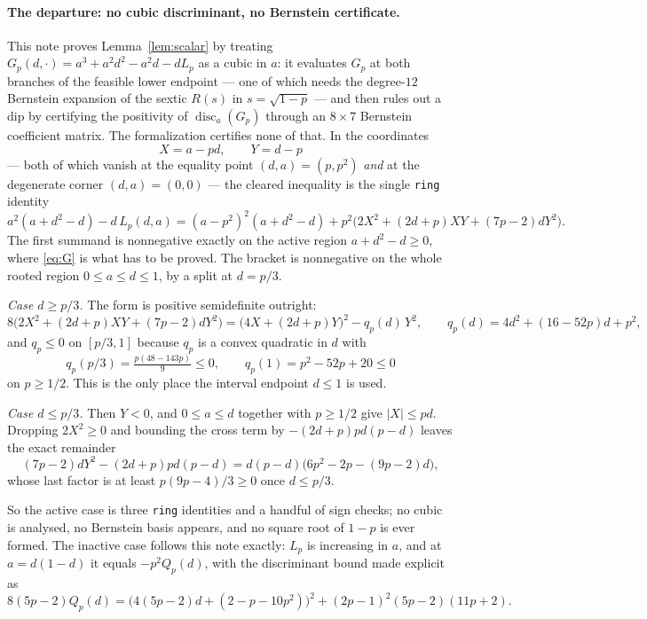 \documentclass[11pt]{article}
\begin{document}
\paragraph{The departure: no cubic discriminant, no Bernstein certificate.}
This note proves Lemma~\ref{lem:scalar} by treating
$G_p(d,\cdot)=a^3+a^2d^2-a^2d-dL_p$ as a cubic in $a$: it evaluates $G_p$ at
both branches of the feasible lower endpoint --- one of which needs the
degree-$12$ Bernstein expansion of the sextic $R(s)$ in $s=\sqrt{1-p}$ --- and
then rules out a dip by certifying the positivity of
$\operatorname{disc}_a(G_p)$ through an $8\times7$ Bernstein coefficient
matrix.  The formalization certifies none of that.  In the coordinates
\[
 X=a-pd,\qquad Y=d-p
\]
--- both of which vanish at the equality point $(d,a)=(p,p^2)$ \emph{and} at the
degenerate corner $(d,a)=(0,0)$ --- the cleared inequality is the single
\texttt{ring} identity
\begin{equation}
 a^2(a+d^2-d)-d\,L_p(d,a)
 =(a-p^2)^2(a+d^2-d)
 +p^2\bigl(2X^2+(2d+p)XY+(7p-2)dY^2\bigr).
 \label{eq:lean-adj}
\end{equation}
The first summand is nonnegative exactly on the active region $a+d^2-d\geq0$,
where \eqref{eq:G} is what has to be proved.  The bracket is nonnegative on the
whole rooted region $0\leq a\leq d\leq1$, by a split at $d=p/3$.

\emph{Case $d\geq p/3$.}  The form is positive semidefinite outright:
\begin{equation}
 8\bigl(2X^2+(2d+p)XY+(7p-2)dY^2\bigr)
 =\bigl(4X+(2d+p)Y\bigr)^2-q_p(d)\,Y^2,
 \qquad
 q_p(d)=4d^2+(16-52p)d+p^2,
 \label{eq:lean-adj-pd}
\end{equation}
and $q_p\leq0$ on $[p/3,1]$ because $q_p$ is a convex quadratic in $d$ with
\[
 q_p(p/3)=\tfrac{p(48-143p)}9\leq0,
 \qquad
 q_p(1)=p^2-52p+20\leq0
\]
on $p\geq1/2$.  This is the only place the interval endpoint $d\leq1$ is used.

\emph{Case $d\leq p/3$.}  Then $Y<0$, and $0\leq a\leq d$ together with
$p\geq1/2$ give $|X|\leq pd$.  Dropping $2X^2\geq0$ and bounding the cross term
by $-(2d+p)pd(p-d)$ leaves the exact remainder
\[
 (7p-2)dY^2-(2d+p)pd(p-d)=d(p-d)\bigl(6p^2-2p-(9p-2)d\bigr),
\]
whose last factor is at least $p(9p-4)/3\geq0$ once $d\leq p/3$.

So the active case is three \texttt{ring} identities and a handful of sign
checks; no cubic is analysed, no Bernstein basis appears, and no square root of
$1-p$ is ever formed.  The inactive case follows this note exactly: $L_p$ is
increasing in $a$, and at $a=d(1-d)$ it equals $-p^2Q_p(d)$, with the
discriminant bound made explicit as
\[
 8(5p-2)Q_p(d)=\bigl(4(5p-2)d+(2-p-10p^2)\bigr)^2+(2p-1)^2(5p-2)(11p+2).
\]
\end{document}
